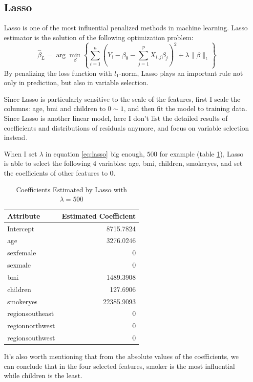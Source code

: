 \documentclass{article}
\begin{document}
\subsection{Lasso}
Lasso is one of the most influential penalized methods in machine learning. Lasso estimator is the solution of the following optimization problem:
\begin{equation}
	\label{eq:lasso}
	\hat{\beta}_L =  \arg \min_{\beta} \left\{\sum_{i = 1}^{n} \left(Y_i - \beta_0 - \sum_{j = 1}^{p} X_{i,j}\beta_j \right)^2 + \lambda \|\beta\|_1\right\}
\end{equation}
By penalizing the loss function with $l_1$-norm, Lasso plays an important rule not only in prediction, but also in variable selection.

Since Lasso is particularly sensitive to the scale of the features, first I scale the columns: age, bmi and children to $0\sim 1$, and then fit the model to training data. Since Lasso is another linear model, here I don't list the detailed results of coefficients and distributions of residuals anymore, and focus on variable selection instead.

When I set $\lambda$ in equation \ref{eq:lasso} big enough, $500$ for example (table \ref{tab:coef_lasso}), Lasso is able to select the following 4 variables: age, bmi, children, smokeryes, and set the coefficients of other features to $0$.
\begin{table}[!ht]
	\centering
	\begin{tabular}{|l|r|}
		\hline
		Attribute & Estimated Coefficient \\
		\hline
		Intercept & 8715.7824 \\
		\hline
		age & 3276.0246 \\
		\hline
		sexfemale & 0 \\
		\hline
		sexmale & 0 \\
		\hline
		bmi & 1489.3908 \\
		\hline
		children & 127.6906 \\
		\hline
		smokeryes & 22385.9093 \\
		\hline
		regionsoutheast & 0 \\
		\hline
		regionnorthwest & 0 \\
		\hline
		regionsouthwest & 0 \\
		\hline
	\end{tabular}
	\caption{Coefficients Estimated by Lasso with $\lambda = 500$}
	\label{tab:coef_lasso}
\end{table}
It's also worth mentioning that from the absolute values of the coefficients, we can conclude that in the four selected features, smoker is the most influential while children is the least.
\end{document}
